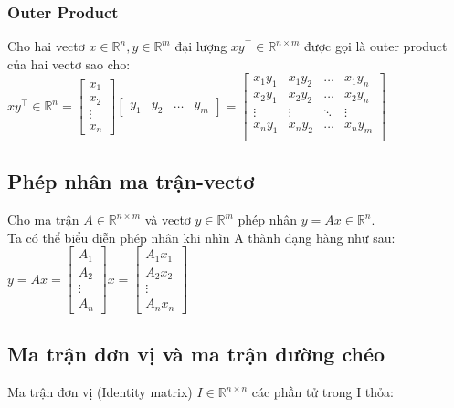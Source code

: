 \subsubsection{Outer Product}
Cho hai vectơ $x \in \mathbb{R}^n, y \in \mathbb{R}^{m}$ đại lượng $xy^\top \in \mathbb{R} ^{n \times m}$ được gọi là outer product của hai vectơ sao cho:\\
$xy^\top \in \mathbb{R} ^{n} =
\left[\begin{matrix}
x_1 \\
x_2 \\
\vdots\\
x_n
\end{matrix}\right] \left[\begin{matrix}y_1 & y_2 & \dots & y_m\end{matrix}\right]
= 
\left[\begin{matrix}
x_1y_1 & x_1y_2 & \dots & x_1y_n\\
x_2y_1 & x_2y_2 & \dots & x_2y_n\\
\vdots & \vdots & \ddots & \vdots \\
x_ny_1 & x_ny_2 & \dots & x_ny_m \\ 
\end{matrix}\right]
$
\subsection{Phép nhân ma trận-vectơ}
Cho ma trận $A \in \mathbb{R} ^{n \times m}$ và vectơ $y \in \mathbb{R}^{m}$ phép nhân $y = Ax \in \mathbb{R}^{n}$.\\
Ta có thể biểu diễn phép nhân khi nhìn A thành dạng hàng như sau:\\
$
y = Ax = 
\left[\begin{matrix}
A_1 \\
A_2 \\ 
\vdots \\
A_n
\end{matrix}\right]x =
\left[\begin{matrix}
A_1x_1\\
A_2x_2 \\ 
\vdots \\
A_nx_n
\end{matrix}\right]
$

\subsection{Ma trận đơn vị và ma trận đường chéo}
Ma trận đơn vị (Identity matrix) $I \in \mathbb{R}^{n \times n}$ các phần tử trong I thỏa:\\


